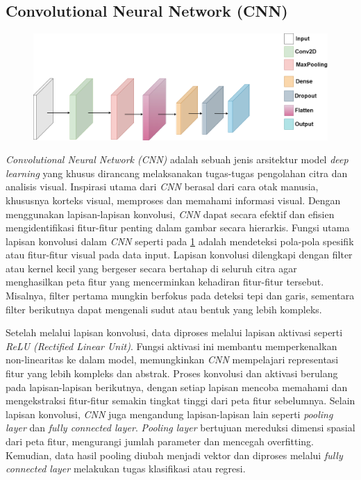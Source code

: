 \subsection{Convolutional Neural Network (CNN)}
\begin{figure}[hbt!]
  \centering
  \includegraphics[width=0.8\linewidth]{gambar/bener/Arsitektur_CNN_Umum.png}
  \label{fig:Arsitektur Umum Convolutional Neural Network}
\end{figure}
\textit{Convolutional Neural Network (CNN)} adalah sebuah jenis arsitektur model \textit{deep learning} yang khusus dirancang melaksanakan tugas-tugas pengolahan citra dan analisis visual. Inspirasi utama dari \textit{CNN} berasal dari cara otak manusia, khususnya korteks visual, memproses dan memahami informasi visual. Dengan menggunakan lapisan-lapisan konvolusi, \textit{CNN} dapat secara efektif dan efisien mengidentifikasi fitur-fitur penting dalam gambar secara hierarkis. Fungsi utama lapisan konvolusi dalam \textit{CNN} seperti pada \ref{fig:Arsitektur Umum Convolutional Neural Network}
adalah mendeteksi pola-pola spesifik atau fitur-fitur visual pada data input. Lapisan konvolusi dilengkapi dengan filter atau kernel kecil yang bergeser secara bertahap di seluruh citra agar menghasilkan peta fitur yang mencerminkan kehadiran fitur-fitur tersebut. Misalnya, filter pertama mungkin berfokus pada deteksi tepi dan garis, sementara filter berikutnya dapat mengenali sudut atau bentuk yang lebih kompleks. \cite{wu2017introduction}

Setelah melalui lapisan konvolusi, data diproses melalui lapisan aktivasi seperti \textit{ReLU (Rectified Linear Unit)}. Fungsi aktivasi ini membantu memperkenalkan non-linearitas ke dalam model, memungkinkan \textit{CNN} mempelajari representasi fitur yang lebih kompleks dan abstrak. Proses konvolusi dan aktivasi berulang pada lapisan-lapisan berikutnya, dengan setiap lapisan mencoba memahami dan mengekstraksi fitur-fitur semakin tingkat tinggi dari peta fitur sebelumnya. Selain lapisan konvolusi, \textit{CNN} juga mengandung lapisan-lapisan lain seperti \textit{pooling layer} dan \textit{fully connected layer}. \textit{Pooling layer} bertujuan mereduksi dimensi spasial dari peta fitur, mengurangi jumlah parameter dan mencegah overfitting. Kemudian, data hasil pooling diubah menjadi vektor dan diproses melalui \textit{fully connected layer} melakukan tugas klasifikasi atau regresi. \cite{koushik2016understanding}

